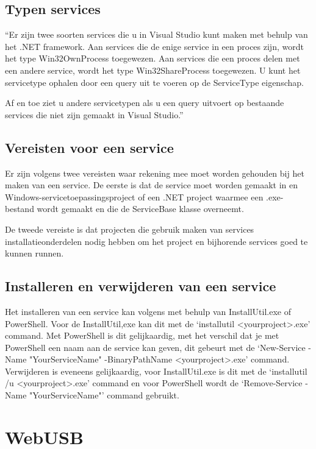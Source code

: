 \subsection{Typen services}
``Er zijn twee soorten services die u in Visual Studio kunt maken met behulp van het .NET framework. Aan services die de enige service in een proces zijn, wordt het type Win32OwnProcess toegewezen. Aan services die een proces delen met een andere service, wordt het type Win32ShareProcess toegewezen. U kunt het servicetype ophalen door een query uit te voeren op de ServiceType eigenschap. 

Af en toe ziet u andere servicetypen als u een query uitvoert op bestaande services die niet zijn gemaakt in Visual Studio.''\autocite{DevMozService}

\subsection{Vereisten voor een service}
Er zijn volgens \textcite{DevMozService} twee vereisten waar rekening mee moet worden gehouden bij het maken van een service. De eerste is dat de service moet worden gemaakt in en Windows-servicetoepassingsproject of een .NET project waarmee een .exe-bestand wordt gemaakt en die de ServiceBase klasse overneemt. 

De tweede vereiste is dat projecten die gebruik maken van services installatieonderdelen nodig hebben om het project en bijhorende services goed te kunnen runnen. 

\subsection{Installeren en verwijderen van een service}
Het installeren van een service kan volgens \textcite{DevMozServiceInstall} met behulp van InstallUtil.exe of PowerShell. Voor de InstallUtil,exe kan dit met de ‘installutil <yourproject>.exe’ command. Met PowerShell is dit gelijkaardig, met het verschil dat je met PowerShell een naam aan de service kan geven, dit gebeurt met de ‘New-Service -Name "YourServiceName" -BinaryPathName <yourproject>.exe’ command. Verwijderen is eveneens gelijkaardig, voor InstallUtil.exe is dit met de ‘installutil /u <yourproject>.exe’ command en voor PowerShell wordt de ‘Remove-Service -Name "YourServiceName"’ command gebruikt. 





\section{WebUSB}
